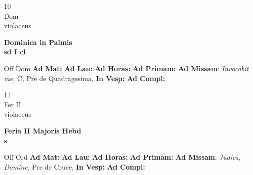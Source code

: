 \documentclass[10pt, openany]{book}
\begin{document}
    \begin{center}
        \begin{minipage}{3.5in}
            \vspace{2em}
            \begin{minipage}{0.5in}
                {\Huge 10} \\
                {\normalsize Dom} \\
                {\normalsize violaceus}
            \end{minipage}
            \begin{minipage}{3.0in}
                \textbf{ \large Dominica in Palmis \\
                \textnormal{\normalsize sd I cl}} \\ 
            \end{minipage}
            \begin{justify}Off Dom
                \textbf{Ad Mat: }
                \textbf{Ad Lau: }
                \textbf{Ad Horas: }
                \textbf{Ad Primam: }\textbf{Ad Missam}: \textit{Invocabit me,} C, Pre de Quadragesima,  
                \textbf{In Vesp: }
                \textbf{Ad Compl: }
            \end{justify}
        \end{minipage}
    \end{center}

    \begin{center}
        \begin{minipage}{3.5in}
            \vspace{2em}
            \begin{minipage}{0.5in}
                {\Huge 11} \\
                {\normalsize Fer II} \\
                {\normalsize violaceus}
            \end{minipage}
            \begin{minipage}{3.0in}
                \textbf{ \large Feria II Majoris Hebd \\
                \textnormal{\normalsize s}} \\ 
            \end{minipage}
            \begin{justify}Off Ord
                \textbf{Ad Mat: }
                \textbf{Ad Lau: }
                \textbf{Ad Horas: }
                \textbf{Ad Primam: }\textbf{Ad Missam}: \textit{Judica, Domine,} Pre de Cruce,  
                \textbf{In Vesp: }
                \textbf{Ad Compl: }
            \end{justify}
        \end{minipage}
    \end{center}
\end{document}
